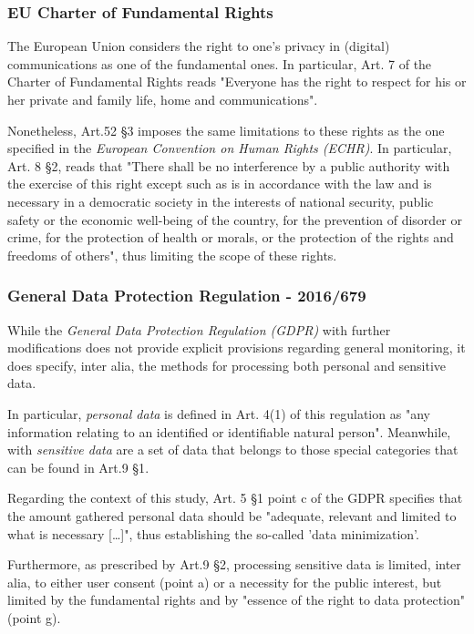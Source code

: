 \subsubsection{EU Charter of Fundamental Rights}

The European Union considers the right to one's privacy in (digital) communications as one of the fundamental ones. In particular, Art. 7 of the Charter of Fundamental Rights reads "Everyone has the right to respect for his or her private and family life, home and communications"\cite{eu_charter_fundamental_rights}. 

Nonetheless, Art.52 \S 3 imposes the same limitations to these rights as the one specified in the \textit{European Convention on Human Rights (ECHR)}\cite{eu_charter_fundamental_rights}. In particular, Art. 8 \S 2, reads that "There shall be no interference by a public authority with the exercise of this right except such as is in accordance with the law and is necessary in a democratic society in the interests of national security, public safety or the economic well-being of the country, for the prevention of disorder or crime, for the protection of health or morals, or the protection of the rights and freedoms of others"\cite{echr}, thus limiting the scope of these rights.

\subsubsection{General Data Protection Regulation - 2016/679}

While the \textit{General Data Protection Regulation (GDPR)} with further modifications does not provide explicit provisions regarding general monitoring, it does specify, inter alia, the methods for processing both personal and sensitive data.

In particular, \textit{personal data} is defined in Art. 4(1) of this regulation \cite{GDPR} as "any information relating to an identified or identifiable natural person". Meanwhile, with \textit{sensitive data} are a set of data that belongs to those special categories that can be found in Art.9 \S 1\cite{GDPR}.

Regarding the context of this study, Art. 5 \S 1 point c of the GDPR\cite{GDPR} specifies that the amount gathered personal data should be "adequate, relevant and limited to what is necessary [\dots]", thus establishing the so-called 'data minimization'.

Furthermore, as prescribed by Art.9 \S 2, processing sensitive data is limited, inter alia, to either user consent (point a) or a necessity for the public interest, but limited by the fundamental rights and by "essence of the right to data protection"\cite{GDPR} (point g).

